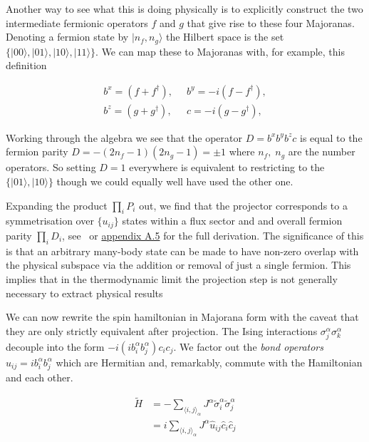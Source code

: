Another way to see what this is doing physically is to explicitly construct the two intermediate fermionic operators \(f\) and \(g\) that give rise to these four Majoranas. Denoting a fermion state by \(|n_f, n_g\rangle\) the Hilbert space is the set \(\{|00\rangle,|01\rangle,|10\rangle,|11\rangle\}\). We can map these to Majoranas with, for example, this definition

\[\begin{aligned}
b^x = (f + f^\dagger),\;\;& b^y = -i(f - f^\dagger),\\
b^z = (g + g^\dagger),\;\;& c = -i(g - g^\dagger),
\end{aligned}\]

Working through the algebra we see that the operator \(D = b^x b^y b^z c\) is equal to the fermion parity \(D = -(2n_f - 1)(2n_g - 1) = \pm1\) where \(n_f,\; n_g\) are the number operators. So setting \(D = 1\) everywhere is equivalent to restricting to the \(\{|01\rangle,|10\rangle\}\) though we could equally well have used the other one.

Expanding the product \(\prod_i P_i\) out, we find that the projector corresponds to a symmetrisation over \(\{u_{ij}\}\) states within a flux sector and and overall fermion parity \(\prod_i D_i\), see~\autocite{pedrocchiPhysicalSolutionsKitaev2011} or \protect\hyperlink{app-the-projector}{appendix A.5} for the full derivation. The significance of this is that an arbitrary many-body state can be made to have non-zero overlap with the physical subspace via the addition or removal of just a single fermion. This implies that in the thermodynamic limit the projection step is not generally necessary to extract physical results

We can now rewrite the spin hamiltonian in Majorana form with the caveat that they are only strictly equivalent after projection. The Ising interactions \(\sigma_j^{\alpha}\sigma_k^{\alpha}\) decouple into the form \(-i (i b^\alpha_i b^\alpha_j) c_i c_j\). We factor out the \emph{bond operators} \(\hat{u}_{ij} = i b^\alpha_i b^\alpha_j\) which are Hermitian and, remarkably, commute with the Hamiltonian and each other.

\[\begin{aligned}
\tilde{H} &=  - \sum_{\langle i,j\rangle_\alpha} J^{\alpha}\tilde{\sigma}_i^{\alpha}\tilde{\sigma}_j^{\alpha}\\
          &=  i \sum_{\langle i,j\rangle_\alpha} J^{\alpha} \hat{u}_{ij} \hat{c}_i \hat{c}_j
\end{aligned}\]

